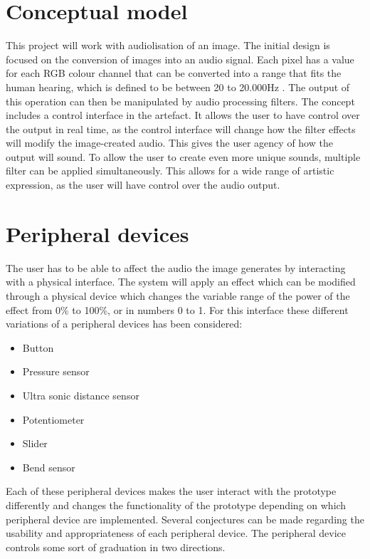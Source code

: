 \section{Conceptual model}\label{sec:conceptualmodel}
This project will work with audiolisation of an image. The initial design is focused on the conversion of images into an audio signal. Each pixel has a value for each RGB colour channel that can be converted into a range that fits the human hearing, which is defined to be between 20 to 20.000Hz \cite{Dsp1997}. The output of this operation can then be manipulated by audio processing filters. The concept includes a control interface in the artefact. It allows the user to have control over the output in real time, as the control interface will change how the filter effects will modify the image-created audio. This gives the user agency of how the output will sound. To allow the user to create even more unique sounds, multiple filter can be applied simultaneously. This allows for a wide range of artistic expression, as the user will have control over the audio output.


\section{Peripheral devices}\label{sec:periphealdevices}
The user has to be able to affect the audio the image generates by interacting with a physical interface. The system will apply an effect which can be modified through a physical device which changes the variable range of the power of the effect from 0\% to 100\%, or in numbers 0 to 1. For this interface these different variations of a peripheral devices has been considered: 

\begin{itemize}
\item Button
\item Pressure sensor
\item Ultra sonic distance sensor
\item Potentiometer
\item Slider
\item Bend sensor
\end{itemize}

Each of these peripheral devices makes the user interact with the prototype differently and changes the functionality of the prototype depending on which peripheral device are implemented. Several conjectures can be made regarding the usability and appropriateness of each peripheral device. The peripheral device controls some sort of graduation in two directions. 

